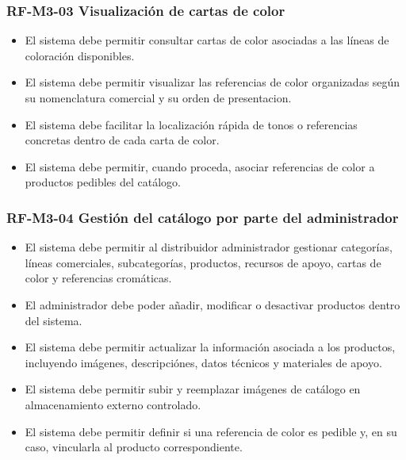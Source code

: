 \vspace{-0.75em}
\subsubsection{RF-M3-03 Visualización de cartas de color}
\vspace{-1em}

\begin{itemize}
    \item El sistema debe permitir consultar cartas de color asociadas a las líneas de coloración disponibles.
    \item El sistema debe permitir visualizar las referencias de color organizadas según su nomenclatura comercial y su orden de presentacion.
    \item El sistema debe facilitar la localización rápida de tonos o referencias concretas dentro de cada carta de color.
    \item El sistema debe permitir, cuando proceda, asociar referencias de color a productos pedibles del catálogo.
\end{itemize}

\vspace{-0.75em}
\subsubsection{RF-M3-04 Gestión del catálogo por parte del administrador}
\vspace{-1em}

\begin{itemize}
    \item El sistema debe permitir al distribuidor administrador gestionar categorías, líneas comerciales, subcategorías, productos, recursos de apoyo, cartas de color y referencias cromáticas.
    \item El administrador debe poder añadir, modificar o desactivar productos dentro del sistema.
    \item El sistema debe permitir actualizar la información asociada a los productos, incluyendo imágenes, descripciónes, datos técnicos y materiales de apoyo.
    \item El sistema debe permitir subir y reemplazar imágenes de catálogo en almacenamiento externo controlado.
    \item El sistema debe permitir definir si una referencia de color es pedible y, en su caso, vincularla al producto correspondiente.
\end{itemize}

